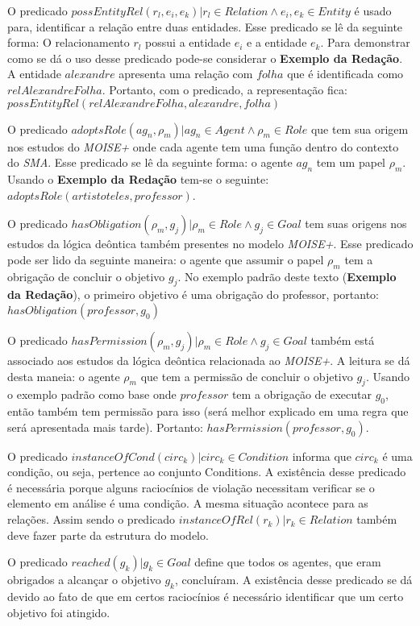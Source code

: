 O predicado $possEntityRel(r_l,e_i,e_k) | r_l \in Relation \wedge  e_i, e_k \in Entity$ é usado para, identificar a relação entre duas entidades. Esse predicado se lê da seguinte forma: O relacionamento $r_l$ possui a entidade $e_i$ e a entidade $e_k$. Para demonstrar como se dá o uso desse predicado pode-se considerar o \textbf{Exemplo da Redação}. A entidade $alexandre$ apresenta uma relação com $folha$ que é identificada como $relAlexandreFolha$. Portanto, com o predicado, a representação fica: $possEntityRel(relAlexandreFolha,alexandre,folha)$

O predicado $adoptsRole(ag_n,\rho_m) | ag_n \in Agent \wedge \rho_m \in Role$ que tem sua origem nos estudos do \textit{MOISE+} onde cada agente tem uma função dentro do contexto do \textit{SMA}. Esse predicado se lê da seguinte forma: o agente $ag_n$ tem um papel $\rho_m$. Usando o \textbf{Exemplo da Redação} tem-se o seguinte: $adoptsRole(artistoteles,professor)$. 

O predicado $hasObligation(\rho_m,g_j) | \rho_m \in Role \wedge g_j \in Goal $ tem suas origens nos estudos da lógica deôntica também presentes no modelo \textit{MOISE+}. Esse predicado pode ser lido da seguinte maneira: o agente que assumir o papel $\rho_m$ tem a obrigação de concluir o objetivo $g_j$. No exemplo padrão deste texto (\textbf{Exemplo da Redação}), o primeiro objetivo é uma obrigação do professor, portanto: $hasObligation(professor,g_0)$

O predicado $hasPermission(\rho_m, g_j) | \rho_m \in Role \wedge g_j \in Goal $ também está associado aos estudos da lógica deôntica relacionada ao \textit{MOISE+}. A leitura se dá desta maneia: o agente $\rho_m$ que tem a permissão de concluir o objetivo $g_j$. Usando o exemplo padrão como base onde $professor$ tem a obrigação de executar $g_0$, então também tem permissão para isso (será melhor explicado em uma regra que será apresentada mais tarde). Portanto: $hasPermission(professor,g_0)$.  

O predicado $instanceOfCond(circ_k) | circ_k \in Condition$ informa que $circ_k$ é uma condição, ou seja, pertence ao conjunto Conditions. A existência desse predicado é necessária porque alguns raciocínios de violação necessitam verificar se o elemento em análise é uma condição. A mesma situação acontece para as relações. Assim sendo o predicado $ instanceOfRel(r_k) | r_k \in Relation $ também deve fazer parte da estrutura do modelo.

O predicado $reached(g_k) | g_k \in Goal $ define que todos os agentes, que eram obrigados a alcançar o objetivo $g_k$, concluíram. A existência desse predicado se dá devido ao fato de que em certos raciocínios é necessário identificar que um certo objetivo foi atingido. 

